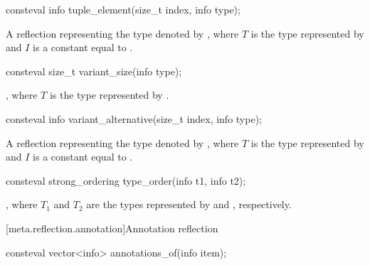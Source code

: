 %
\begin{itemdecl}
consteval info tuple_element(size_t index, info type);
\end{itemdecl}

\begin{itemdescr}
\pnum
\returns
A reflection representing
the type denoted by ,
where $T$ is the type represented by 
and $I$ is a constant equal to .
\end{itemdescr}

%
\begin{itemdecl}
consteval size_t variant_size(info type);
\end{itemdecl}

\begin{itemdescr}
\pnum
\returns
{},
where $T$ is the type represented by .
\end{itemdescr}

%
\begin{itemdecl}
consteval info variant_alternative(size_t index, info type);
\end{itemdecl}

\begin{itemdescr}
\pnum
\returns
A reflection representing the type denoted by
,
where $T$ is the type represented by 
and $I$ is a constant equal to .
\end{itemdescr}

%
\begin{itemdecl}
consteval strong_ordering type_order(info t1, info t2);
\end{itemdecl}

\begin{itemdescr}
\pnum
\returns
{},
where $T_1$ and $T_2$ are the types
represented by  and , respectively.
\end{itemdescr}

[meta.reflection.annotation]{Annotation reflection}

%
\begin{itemdecl}
consteval vector<info> annotations_of(info item);
\end{itemdecl}

